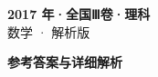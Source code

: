 \documentclass[zihao=-4, a4paper]{ctexart}
\begin{document}
\begin{center}
  {\Large\bfseries 2017 年·全国Ⅲ卷·理科}\\[4pt]
  {\large 数学 · 解析版}
\end{center}
\medskip
{}

\clearpage
{}
\begin{center}{\Large\bfseries 参考答案与详细解析}\end{center}
\medskip

\end{document}
